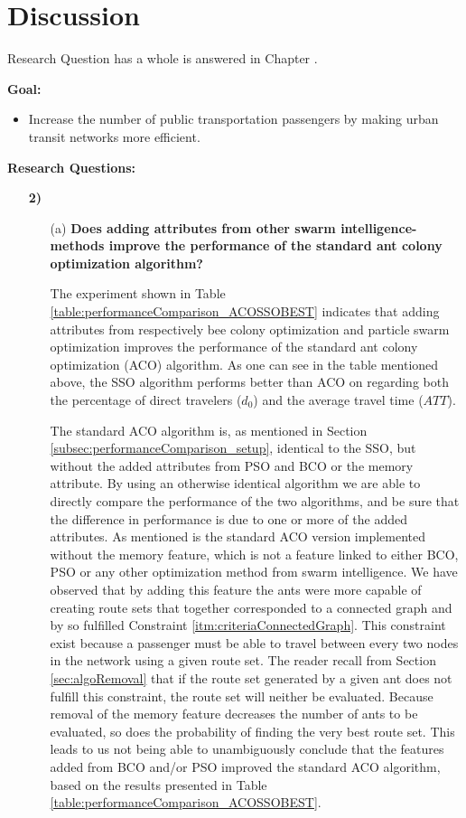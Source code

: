 \section{Discussion}
Research Question \label{itm:1} has a whole is answered in Chapter \label{relatedWork}.

\textbf{Goal:}
\begin{itemize}
\item  Increase the number of public transportation passengers by making urban transit networks more efficient.
\end{itemize}

\textbf{Research Questions:}
\begin{enumerate}[label=\textbf{\arabic*})]
\item[\textbf{2)}]
    \begin{enumerate}

    \item[(a)]  \textbf{Does adding attributes from other swarm intelligence-methods improve the performance of the standard ant colony optimization algorithm?}

    The experiment shown in Table \vref{table:performanceComparison_ACOSSOBEST} indicates that adding attributes from respectively bee colony optimization and particle swarm optimization improves the performance of the standard ant colony optimization (ACO) algorithm. As one can see in the table mentioned above, the SSO algorithm performs better than ACO on regarding both the percentage of direct travelers ($d_0$) and the average travel time ($ATT$).

    The standard ACO algorithm is, as mentioned in Section \vref{subsec:performanceComparison_setup}, identical to the SSO, but without the added attributes from PSO and BCO or the memory attribute. By using an otherwise identical algorithm we are able to directly compare the performance of the two algorithms, and be sure that the difference in performance is due to one or more of the added attributes. As mentioned is the standard ACO version implemented without the memory feature, which is not a feature linked to either BCO, PSO or any other optimization method from swarm intelligence. We have observed that by adding this feature the ants were more capable of creating route sets that together corresponded to a connected graph and by so fulfilled Constraint \vref{itm:criteriaConnectedGraph}. This constraint exist because a passenger must be able to travel between every two nodes in the network using a given route set. The reader recall from Section \vref{sec:algoRemoval} that if the route set generated by a given ant does not fulfill this constraint, the route set will neither be evaluated. Because removal of the memory feature decreases the number of ants to be evaluated, so does the probability of finding the very best route set. This leads to us not being able to unambiguously conclude that the features added from BCO and/or PSO improved the standard ACO algorithm, based on the results presented in Table \vref{table:performanceComparison_ACOSSOBEST}. 


\end{enumerate}
\end{enumerate}
